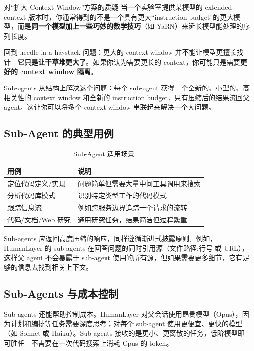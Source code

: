 \begin{warningbox}{对``扩大 Context Window''方案的质疑}
当一个实验室提供某模型的 extended-context 版本时，你通常得到的不是一个具有更大``instruction budget''的更大模型，而是\textbf{同一个模型加上一些巧妙的数学技巧}（如 YaRN）来延长模型能处理的序列长度。

回到 needle-in-a-haystack 问题：更大的 context window 并不能让模型更擅长找针---\textbf{它只是让干草堆更大了}。如果你认为需要更长的 context，你可能只是需要\textbf{更好的 context window 隔离}。
\end{warningbox}

Sub-agents 从结构上解决这个问题：每个 sub-agent 获得一个全新的、小型的、高相关性的 context window 和全新的 instruction budget，只有压缩后的结果流回父 agent。这让你可以将多个 context window 串联起来解决一个大问题。

\subsection{Sub-Agent 的典型用例}

\begin{table}[H]
\centering
\caption{Sub-Agent 适用场景}
\begin{tabular}{@{}p{4.5cm}p{8.5cm}@{}}
\toprule
\textbf{用例} & \textbf{说明} \\
\midrule
定位代码定义/实现 & 问题简单但需要大量中间工具调用来搜索 \\
分析代码库模式 & 识别特定类型工作的代码模式 \\
跟踪信息流 & 例如跨服务边界追踪一个请求的流转 \\
代码/文档/Web 研究 & 通用研究任务，结果简洁但过程繁重 \\
\bottomrule
\end{tabular}
\end{table}

Sub-agents 应返回高度压缩的响应，同样遵循渐进式披露原则。例如，HumanLayer 的 sub-agents 在回答问题的同时引用源（文件路径:行号 或 URL），这样父 agent 不会暴露于 sub-agent 使用的所有源，但如果需要更多细节，它有足够的信息去找到相关上下文。

\subsection{Sub-Agents 与成本控制}

Sub-agents 还能帮助控制成本。HumanLayer 对父会话使用昂贵模型（Opus），因为计划和编排等任务需要深度思考；对每个 sub-agent 使用更便宜、更快的模型（如 Sonnet 或 Haiku）。Sub-agents 接收的是更小、更离散的任务，低阶模型即可胜任---不需要在一次代码搜索上消耗 Opus 的 token。

